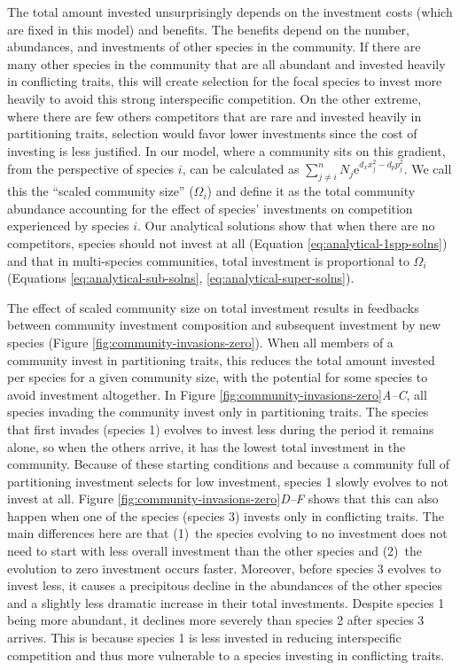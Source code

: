 The total amount invested unsurprisingly depends on the investment costs
(which are fixed in this model) and benefits.
The benefits depend on the number, abundances, and investments of other 
species in the community.
If there are many other species in the community that are all abundant 
and invested heavily in conflicting traits, this will create selection 
for the focal species to invest more heavily to avoid this strong 
interspecific competition.
On the other extreme, where there are few others competitors that are rare
and invested heavily in partitioning traits, selection would favor lower
investments since the cost of investing is less justified.
In our model, where a community sits on this gradient, from the perspective
of species $i$, can be calculated as
$\sum_{j \ne i}^{n}{ N_j \text{e}^{ d_x x_j^2 - d_p p_j^2 } }$.
We call this the ``scaled community size'' ($\Omega_i$) and define it as the
total community abundance accounting for the effect of species' investments 
on competition experienced by species $i$.
Our analytical solutions show that when there are no competitors, 
species should not invest at all
(Equation \ref{eq:analytical-1spp-solns})
and that in multi-species communities, 
total investment is proportional to $\Omega_i$
(Equations \ref{eq:analytical-sub-solns}, \ref{eq:analytical-super-solns}).



The effect of scaled community size on total investment results in feedbacks
between community investment composition and subsequent investment by new
species (Figure \ref{fig:community-invasions-zero}).
When all members of a community invest in partitioning traits, this reduces
the total amount invested per species for a given community size, with the
potential for some species to avoid investment altogether.
In Figure \ref{fig:community-invasions-zero}\textit{A--C}, all species invading
the community invest only in partitioning traits. 
The species that first invades (species 1) evolves to invest less during 
the period it remains alone, so when the others arrive, it has the lowest 
total investment in the community.
Because of these starting conditions and because a community full of
partitioning investment selects for low investment,
species 1 slowly evolves to not invest at all.
Figure \ref{fig:community-invasions-zero}\textit{D--F} shows that this can also 
happen when one of the species (species 3) invests only in conflicting traits.
The main differences here are that
(1)~the species evolving to no investment does not need to start with 
less overall investment than the other species and
(2)~the evolution to zero investment occurs faster.
Moreover, before species 3 evolves to invest less, it causes a precipitous
decline in the abundances of the other species and a slightly less 
dramatic increase in their total investments.
Despite species 1 being more abundant, it declines more severely than 
species 2  after species 3 arrives.
This is because species 1 is less invested in reducing interspecific competition
and thus more vulnerable to a species investing in conflicting traits.


